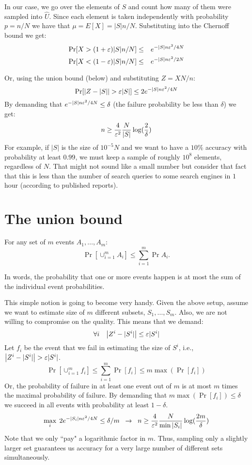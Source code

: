 In our case, we go over the elements of $S$ and count  
how many of them were sampled into $\hat{U}$.
Since each element is taken independently with probability $p = n/N$ we have that 
$\mu = E[X] = |S|n/N$. Substituting into the Chernoff bound we get:
\begin{eqnarray}
\Pr[X > (1+\varepsilon) |S|n/N] &\le& e^{-|S|n\varepsilon^2/4N}\\
\Pr[X < (1-\varepsilon) |S|n/N] &\le& e^{-|S|n\varepsilon^2/2N}
\end{eqnarray}

\noindent Or, using the union bound (below) and substituting  $Z = XN/n$:
\[
\Pr[\left| Z - |S| \right| > \varepsilon|S| ] \le 2 e^{-|S|n\varepsilon^2/4N}
\]
By demanding that $e^{-|S|n\varepsilon^2/4N} \le \delta$ (the failure probability be less than $\delta$) we get:
\[
n \ge \frac{4}{\varepsilon^2}\frac{N}{|S|}\log(\frac{2}{\delta})
\]
For example, if $|S|$ is the size of $10^{-5}N$ and we want to have a $10\%$ accuracy with probability at least $0.99$,
we must keep a sample of roughly $10^{8}$ elements, regardless of $N$. 
That might not sound like a small number but consider that fact that this is less than the number of search queries to some search engines in $1$ hour (according to published reports). 

\section{The union bound}
\begin{lemma}
For any set of $m$ events $A_1,\ldots,A_m$:
\[
\Pr[\cup_{i=1}^{m}A_i] \le \sum_{i=1}^{m}\Pr{A_i}.
\]
\end{lemma}
In words, the probability that one or more events happen is at most the sum of the 
individual event probabilities. 

This simple notion is going to become very handy. Given the above setup, assume we want to
estimate size of $m$ different subsets, $S_1,\ldots,S_m$.
Also, we are not willing to compromise on the quality. This means that we demand:
\[
\forall i \;\;\;\left| Z^i - |S^i| \right| \le \varepsilon|S^i| 
\]
Let $f_i$ be the event that we fail in estimating the size of $S^i$, i.e., $\left| Z^i - |S^i| \right| > \varepsilon|S^i|$.
\[
\Pr[\cup_{i=1}^{m}f_i] \le \sum_{i=1}^{m}\Pr[f_i] \le m \max(\Pr[f_i]) 
\]
Or, the probability of failure in at least one event out of $m$ is at most $m$ times the maximal probability of failure.
By demanding that $ m \max(\Pr[f_i]) \le \delta$ we succeed in all events with probability at least $1-\delta$.
\[
\max_i \; 2e^{-|S_i|n\varepsilon^2/4N} \le \delta/m \;\; \rightarrow \;\; n \ge \frac{4}{\varepsilon^2}\frac{N}{\min{|S_i|}}\log(\frac{2m}{\delta})
\]
Note that we only ``pay" a logarithmic factor in $m$.
Thus, sampling only a slightly larger set guarantees us accuracy for a very large number of
different sets simultaneously.


